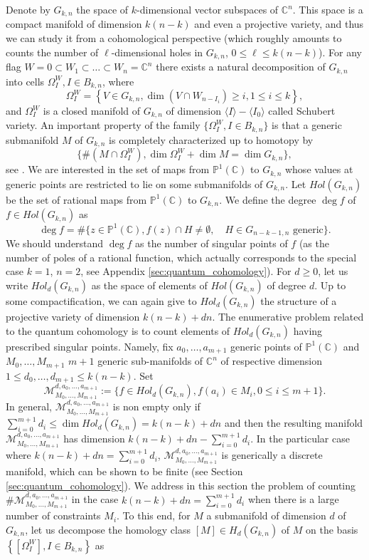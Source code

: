 \documentclass[10pt,11pt]{amsart}%
\begin{document}
Denote by $G_{k,n}$ the space of $k$-dimensional vector subspaces of $\mathbb{C}^n$. This space is a compact manifold of dimension $k(n-k)$ and even a projective variety, and thus we can study it from a cohomological perspective (which roughly amounts to counts the number of $\ell$-dimensional holes in $G_{k,n}$, $0\leq \ell \leq k(n-k)$). For any flag $W=0\subset W_1\subset\dots\subset W_n=\mathbb{C}^n$ there exists a natural decomposition of $G_{k,n}$ into cells $\Omega_{I}^W, I \in B_{k,n}$, where 
$$\Omega_I^W=\left\{ V\in G_{k,n}, \dim(V\cap W_{n-I_i})\geq i, 1\leq i\leq k\right\},$$ 
and $\Omega_I^W$ is a closed manifold of $G_{k,n}$ of dimension $\langle I\rangle-\langle I_0\rangle$ called Schubert variety. An important property of the family $\{\Omega^W_I, I\in B_{k,n}\}$ is that a generic submanifold $M$ of $G_{k,n}$ is completely characterized up to homotopy by
$$\{\#(M\cap  \Omega_I^W), \dim \Omega^W_I+\dim M=\dim G_{k,n}\},$$
see \cite{Fulton1997}.
We are interested in the set of maps from $\mathbb{P}^1(\mathbb{C})$ to $G_{k,n}$ whose values at generic points are restricted to lie on some submanifolds of $G_{k,n}$. Let $Hol(G_{k,n})$ be the set of rational maps from $\mathbb{P}^1(\mathbb{C})$ to $G_{k,n}$. We define the degree $\deg f$ of $f\in Hol(G_{k,n})$ as
$$\deg f=\#\{z\in \mathbb{P}^1(\mathbb{C}), f(z)\cap H\not=\emptyset, \quad H\in G_{n-k-1,n} \text{ generic}\}.$$
We should understand $\deg f$ as the number of singular points of $f$ (as the number of poles of a rational function, which actually corresponds to the special case $k=1$, $n=2$, see Appendix \ref{sec:quantum_cohomology}). For $d\geq 0$, let us write $Hol_d(G_{k,n})$ as the space of elements of $Hol(G_{k,n})$ of degree $d$. Up to some compactification, we can again give to $Hol_d(G_{k,n})$ the structure of a projective variety of dimension $k(n-k)+dn$. The enumerative problem related to the quantum cohomology is to count elements of $Hol_d(G_{k,n})$ having prescribed singular points. Namely, fix $a_0,\ldots,a_{m+1}$ generic points of $\mathbb{P}^1(\mathbb{C})$ and $M_0,\ldots,M_{m+1}$ $m+1$ generic sub-manifolds of $\mathbb{C}^n$ of respective dimension $1\leq d_0,\ldots,d_{m+1}\leq k(n-k)$. Set 
$$\mathcal{M}^{d,a_0,\ldots,a_{m+1}}_{M_0,\ldots,M_{m+1}}:=\{f\in Hol_d(G_{k,n}), f(a_i)\in M_{i}, 0\leq i\leq m+1\}.$$
In general, $\mathcal{M}^{d,a_0,\ldots,a_{m+1}}_{M_0,\ldots,M_{m+1}}$ is non empty only if $\sum_{i=0}^{m+1} d_i\leq \dim Hol_d(G_{k,n})=k(n-k)+dn$ and then the resulting manifold $\mathcal{M}^{d,a_0,\ldots,a_{m+1}}_{M_0,\ldots,M_{m+1}}$ has dimension $k(n-k)+dn-\sum_{i=0}^{m+1}d_i$. In the particular case where $k(n-k)+dn=\sum_{i=0}^{m+1}d_i$, $\mathcal{M}^{d,a_0,\ldots,a_{m+1}}_{M_0,\ldots,M_{m+1}}$ is generically a discrete manifold, which can be shown to be finite (see Section \ref{sec:quantum_cohomology}). We address in this section the problem of counting $\#\mathcal{M}^{d,a_0,\ldots,a_{m+1}}_{M_0,\ldots,M_{m+1}}$ in the case $k(n-k)+dn=\sum_{i=0}^{m+1}d_i$ when there is a large number of constraints $M_i$. To this end, for $M$ a submanifold of dimension $d$ of $G_{k,n}$, let us decompose the homology class $[M]\in H_d(G_{k,n})$ of $M$ on the basis $\left\{\left[\Omega_I^W\right], I\in B_{k,n}\right\}$ as 
\end{document}

